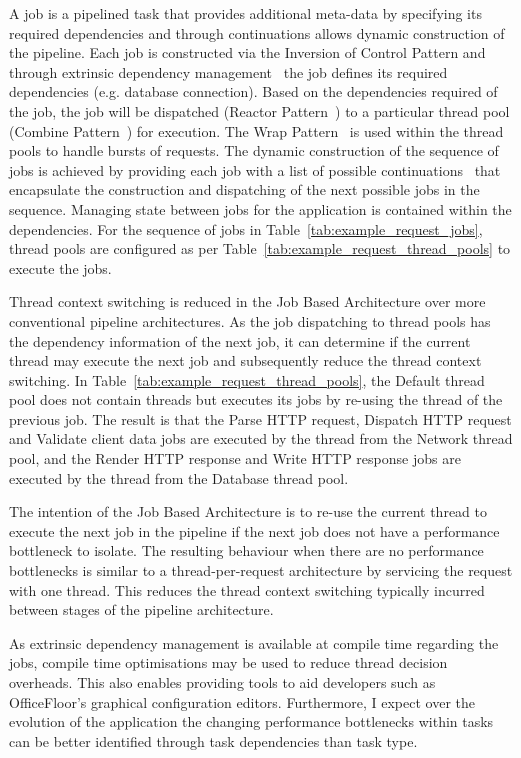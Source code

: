 \documentclass[conference]{ieee/IEEEtran}
\begin{document}
A job is a pipelined task that provides additional meta-data by specifying its
required dependencies and through continuations allows dynamic construction of
the pipeline.  Each job is constructed via the Inversion of Control Pattern and
through extrinsic dependency management~\cite{ioc} the job defines its required
dependencies (e.g. database connection).  Based on the dependencies required of
the job, the job will be dispatched (Reactor Pattern~\cite{reactor}) to a
particular thread pool (Combine Pattern~\cite{pipeline}) for execution.
The Wrap Pattern~\cite{pipeline} is used within the thread pools to handle
bursts of requests.  The dynamic construction of the sequence of jobs is
achieved by providing each job with a list of possible
continuations~\cite{continuations} that encapsulate the construction and
dispatching of the next possible jobs in the sequence. Managing state between
jobs for the application is contained within the dependencies.  For the sequence
of jobs in Table~\ref{tab:example_request_jobs}, thread pools are configured as
per Table~\ref{tab:example_request_thread_pools} to execute the jobs.

Thread context switching is reduced in the Job Based Architecture over more
conventional pipeline architectures.  As the job dispatching to thread pools has
the dependency information of the next job, it can determine if the current
thread may execute the next job and subsequently reduce the thread context
switching.  In Table~\ref{tab:example_request_thread_pools}, the Default thread
pool does not contain threads but executes its jobs by re-using the thread of
the previous job.  The result is that the Parse HTTP request, Dispatch HTTP
request and Validate client data jobs are executed by the thread from the
Network thread pool, and the Render HTTP response and Write HTTP response jobs
are executed by the thread from the Database thread pool.

The intention of the Job Based Architecture is to re-use the current thread to
execute the next job in the pipeline if the next job does not have a performance
bottleneck to isolate.  The resulting behaviour when there are no performance
bottlenecks is similar to a thread-per-request architecture by servicing the
request with one thread.  This reduces the thread context switching typically
incurred between stages of the pipeline architecture.

As extrinsic dependency management is available at compile time regarding the
jobs, compile time optimisations may be used to reduce thread decision
overheads.  This also enables providing tools to aid developers such as
OfficeFloor's graphical configuration editors.  Furthermore,  I expect over the
evolution of the application the changing performance bottlenecks within tasks
can be better identified through task dependencies than task type.
\end{document}

